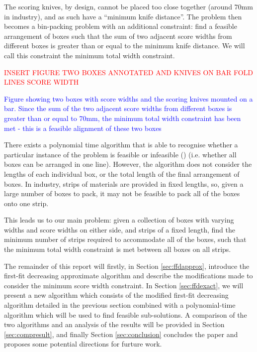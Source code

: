 \documentclass[oribibl]{llncs}
\begin{document}
The scoring knives, by design, cannot be placed too close together (around 70mm in industry), and as such have a ``minimum knife distance''. The problem then becomes a bin-packing problem with an additional constraint: find a feasible arrangement of boxes such that the sum of two adjacent score widths from different boxes is greater than or equal to the minimum knife distance. We will call this constraint the minimum total width constraint.

\textcolor{red}{INSERT FIGURE TWO BOXES ANNOTATED AND KNIVES ON BAR FOLD LINES SCORE WIDTH}

\textcolor{blue}{Figure showing two boxes with score widths and the scoring knives mounted on a bar. Since the sum of the two adjacent score widths from different boxes is greater than or equal to 70mm, the minimum total width constraint has been met - this is a feasible alignment of these two boxes}

There exists a polynomial time algorithm that is able to recognise whether a particular instance of the problem is feasible or infeasible (\citealp{becker2010}) (i.e. whether all boxes can be arranged in one line). However, the algorithm does not consider the lengths of each individual box, or the total length of the final arrangement of boxes. In industry, strips of materials are provided in fixed lengths, so, given a large number of boxes to pack, it may not be feasible to pack all of the boxes onto one strip. 

This leads us to our main problem: given a collection of boxes with varying widths and score widths on either side, and strips of a fixed length, find the minimum number of strips required to accommodate all of the boxes, such that the minimum total width constraint is met between all boxes on all strips. 

The remainder of this report will firstly, in Section \ref{sec:ffdapprox}, introduce the first-fit decreasing approximate algorithm and describe the modifications made to consider the minimum score width constraint. In Section \ref{sec:ffdexact}, we will present a new algorithm which consists of the modified first-fit decreasing algorithm detailed in the previous section combined with a polynomial-time algorithm which will be used to find feasible sub-solutions. A comparison of the two algorithms and an analysis of the results will be provided in Section \ref{sec:compresult}, and finally Section \ref{sec:conclusion} concludes the paper and proposes some potential directions for furture work.
\end{document}
